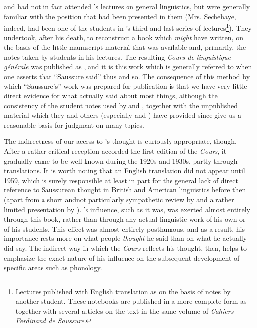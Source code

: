  and  had not in fact attended {\Saussure}'s
lectures on general linguistics, but were generally familiar with the
position that had been presented in them (Mrs.  Sechehaye, indeed, had
been one of the students in {\Saussure}'s third and last series of
lectures\footnote{Lectures published with {English} translation as
  \citealt{saussure93:troisieme-cours} on the basis of notes by
  another student.  These notebooks are published in a more complete
  form as \citealt{constantin05:troisieme-cours} together with several
  articles on the text in the same volume of \textsl{Cahiers Ferdinand
    de Saussure}.}).  They undertook, after his death, to reconstruct
a book which {\Saussure} \emph{might} have written, on the basis of the
little manuscript material that was available and, primarily, the
notes taken by students in his lectures. The resulting \textsl{Cours
  de linguistique générale} was published as
\citealt{saussure16:cours-original}, and it is this work which is
generally referred to when one asserts that ``Saussure said'' thus and
so. The consequence of this method by which ``Saussure's'' work was
prepared for publication is that we have very little direct evidence
for what {\Saussure} actually said about most things, although the
consistency of the student notes used by {\Bally} and {\Sechehaye}, together
with the unpublished material which they and others (especially
\citet{godel54:notes,godel57:sources} and
\citet{engler68-74:edition.critique}) have provided since give us a
reasonable basis for judgment on many topics.

The indirectness of our access to {\Saussure}'s thought is curiously
appropriate, though. After a rather critical reception accorded the
first edition of the \textsl{Cours}, it gradually came to be well
known during the 1920s and 1930s, partly through translations. It is
worth noting that an {English} translation did not appear until 1959,
which is surely responsible at least in part for the general lack of
direct reference to Saussurean thought in British and American
linguistics before then (apart from a short andnot particularly
sympathetic review by \citet{bloomfield23:review-saussure} and a
rather limited presentation by \citet{wells47:saussure}).  {\Saussure}'s
influence, such as it was, was exerted almost entirely through this
book, rather than through any actual linguistic work of his own or of
his students.  This effect was almost entirely posthumous, and as a
result, his importance rests more on what people \emph{thought} he
said than on what he actually did say.  The indirect way in which the
\textsl{Cours} reflects his thought, then, helps to emphasize the
exact nature of his influence on the subsequent development of
specific areas such as phonology.

